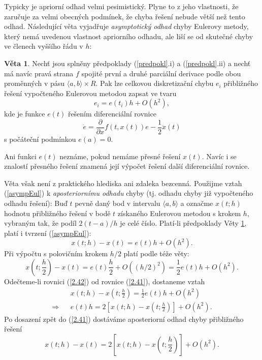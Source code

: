 \documentclass[a4paper, 12pt]{book}
\theoremstyle{definition}
\newtheorem{theorem}{Věta}[section]
\begin{document}
Typicky je apriorní odhad velmi pesimistický. Plyne to z jeho vlastnosti, že 
zaručuje za velmi obecných podmínek, že chyba řešení nebude větší než tento odhad.
Následující věta vyjadřuje {\em asymptotický odhad} chyby Eulerovy metody, který 
nemá uvedenou vlastnost apriorního odhadu, ale liší se od skutečné chyby ve členech
vyššího řádu v $h$:
\begin{theorem}\label{Veta2.4}
Nechť jsou splněny předpoklady (\ref{predpokl}.i) a (\ref{predpokl}.ii) a nechť
má navíc pravá strana $f$ spojité první a druhé parciální derivace podle obou 
proměnných v pásu $\langle a,b\rangle\times R$. Pak lze celkovou diskretizační 
chybu $e_i$ přibližného řešení vypočteného Eulerovou metodou zapsat ve tvaru
\begin{equation}\label{asympEul}
e_i=e(t_i)h+O(h^2),
\end{equation}
kde je funkce $e(t)$ řešením diferenciální rovnice
\begin{displaymath}
\dot e=\frac{\partial}{\partial x}f(t,x(t))e-\frac 12\ddot x(t)
\end{displaymath}
s počáteční podmínkou $e(a)=0$.
\end{theorem}
Ani funkci $e(t)$ neznáme, pokud nemáme přesné řešení $x(t)$. Navíc i se
znalostí přesného řešení znamená její výpočet řešení další diferenciální
rovnice.

Věta však není z praktického hlediska ani zdaleka bezcenná. Použijme
vztah (\ref{asympEul}) k {\em aposteriornímu odhadu} chyby (tj. odhadu
chyby již vypočteného odhadu řešení): Buď $t$ pevně daný bod v intervalu
$\langle a,b\rangle$ a označme $x(t;h)$ hodnotu přibližného řešení v bodě 
$t$ získaného Eulerovou metodou s krokem $h$, vybraným tak, že
podíl $2(t-a)/h$ je celé číslo. Platí-li předpoklady Věty
\ref{Veta2.4}, platí i tvrzení (\ref{asympEul}):
\begin{equation}\label{2.41}
x(t;h)-x(t)=e(t)h+O(h^2).
\end{equation}
Při výpočtu s polovičním krokem $h/2$ platí podle téže věty:
\begin{equation}\label{2.42}
x(t;\frac h2)-x(t)=e(t)\frac h2+O((h/2)^2)=\frac 12 e(t)h+O(h^2).
\end{equation}
Odečteme-li rovnici (\ref{2.42}) od rovnice (\ref{2.41}), dostaneme vztah
\begin{eqnarray*}
&&x(t;h)-x(t;\frac h2)=\frac 12 e(t)h+O(h^2)\\
\Rightarrow&& e(t)h=2[x(t;h)-x(t;\frac h2)]+O(h^2).
\end{eqnarray*}
Po dosazení zpět do (\ref{2.41}) dostáváme aposteriorní odhad chyby 
přibližného řešení
\begin{equation}\label{polkrok}
x(t;h)-x(t)=2[x(t;h)-x(t;\frac h2)]+O(h^2).
\end{equation}
\end{document}
